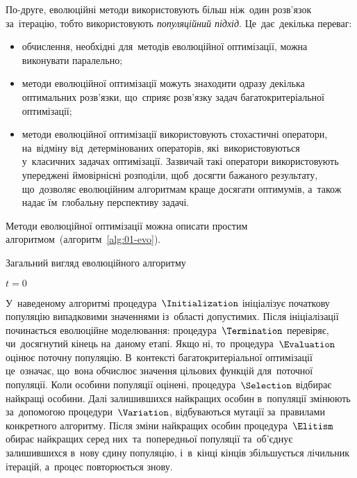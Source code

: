 \documentclass[
  a4paper,
  oneside,
  BCOR = 10mm,
  DIV = 12,
  12pt,
  headings = normal,
]{scrartcl}
\begin{document}
      По-друге, еволюційні методи використовують більш ніж~один розв'язок за~ітерацію, тобто використовують \emph{популяційний підхід}. Це~дає~декілька переваг:
      \begin{itemize}
        \item обчислення, необхідні для~методів еволюційної оптимізації, можна виконувати паралельно;
        \item методи еволюційної оптимізації можуть знаходити одразу декілька оптимальних розв'язки, що~сприяє розв'язку задач багатокритеріальної оптимізації;
        \item методи еволюційної оптимізації використовують стохастичні оператори, на~відміну від~детермінованих операторів, які~використовуються у~класичних задачах оптимізації. Зазвичай такі оператори використовують упереджені ймовірнісні розподіли, щоб~досягти бажаного результату, що~дозволяє еволюційним алгоритмам краще досягати оптимумів, а~також надає їм~глобальну перспективу задачі.
      \end{itemize}
      Методи еволюційної оптимізації можна описати простим алгоритмом~(алгоритм~\ref{alg:01-evo}).

      \begin{algorithm}
        \caption{Загальний вигляд еволюційного алгоритму}
        \label{alg:01-evo}
        $t = 0$\;
        \;
      \end{algorithm}

      У~наведеному алгоритмі процедура~$\Initialization$ ініціалізує початкову популяцію випадковими значеннями із~області допустимих. Після ініціалізації починається еволюційне моделювання: процедура~$\Termination$ перевіряє, чи~досягнутий кінець на~даному етапі. Якщо ні, то~процедура~$\Evaluation$ оцінює поточну популяцію. В~контексті багатокритеріальної оптимізації це~означає, що~вона обчислює значення цільових функцій для~поточної популяції. Коли особини популяції оцінені, процедура~$\Selection$ відбирає найкращі особини. Далі залишившихся найкращих особин в~популяції змінюють за~допомогою процедури~$\Variation$, відбуваються мутації за~правилами конкретного алгоритму. Після зміни найкращих особин процедура~$\Elitism$ обирає найкращих серед них~та~попередньої популяції та~об'єднує залишившихся в~нову єдину популяцію, і~в~кінці кінців збільшується лічильник ітерацій, а~процес повторюється знову.
\end{document}
